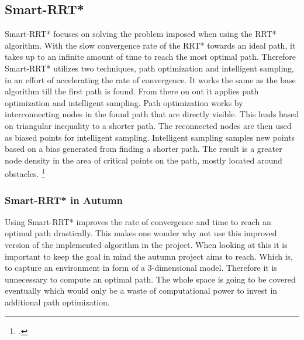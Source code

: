 \subsection{Smart-RRT*}

Smart-RRT* focuses on solving the problem imposed when using the RRT* algorithm. With the slow convergence rate of the RRT* towards an ideal path, it takes up to an infinite amount of time to reach the most optimal path. Therefore Smart-RRT* utilizes two techniques, path optimization and intelligent sampling, in an effort of accelerating the rate of convergence. 
It works the same as the base algorithm till the first path is found. From there on out it applies path optimization and intelligent sampling. Path optimization works by interconnecting nodes in the found path that are directly visible. This leads based on triangular inequality to a shorter path. The reconnected nodes are then used as biased points for intelligent sampling. Intelligent sampling samples new points based on a bias generated from finding a shorter path. The result is a greater node density in the area of critical points on the path, mostly located around obstacles. 
\footcite{Islam2012}

\subsubsection{Smart-RRT* in Autumn}
Using Smart-RRT* improves the rate of convergence and time to reach an optimal path drastically. This makes one wonder why not use this improved version of the implemented algorithm in the project. When looking at this it is important to keep the goal in mind the autumn project aims to reach. Which is, to capture an environment in form of a 3-dimensional model. Therefore it is unnecessary to compute an optimal path. The whole space is going to be covered eventually which would only be a waste of computational power to invest in additional path optimization. 